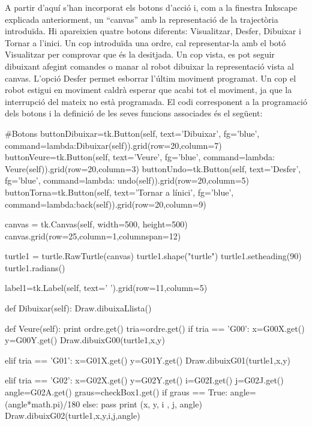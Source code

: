 A partir d’aquí s’han incorporat els botons d’acció i, com a la finestra Inkscape explicada anteriorment, un “canvas” amb la representació de la trajectòria introduïda. Hi apareixien quatre botons diferents: Visualitzar, Desfer, Dibuixar i Tornar a l’inici. Un cop introduïda una ordre, cal representar-la amb el botó Visualitzar per comprovar que és la desitjada. Un cop vista, es pot seguir dibuixant afegint comandes o manar al robot dibuixar la representació vista al canvas. L’opció Desfer permet esborrar l’últim moviment programat. Un cop el robot estigui en moviment caldrà esperar que acabi tot el moviment, ja que la interrupció del mateix no està programada. El codi corresponent a la programació dels botons i la definició de les seves funcions associades és el següent:

\begin{python}
			#Botons
			buttonDibuixar=tk.Button(self, text='Dibuixar', fg='blue', command=lambda:Dibuixar(self)).grid(row=20,column=7)
			buttonVeure=tk.Button(self, text='Veure', fg='blue', command=lambda: Veure(self)).grid(row=20,column=3)
			buttonUndo=tk.Button(self, text='Desfer', fg='blue', command=lambda: undo(self)).grid(row=20,column=5)
			buttonTorna=tk.Button(self, text='Tornar a l\'inici', fg='blue', command=lambda:back(self)).grid(row=20,column=9)
			
			canvas = tk.Canvas(self, width=500, height=500)
			canvas.grid(row=25,column=1,columnspan=12)
			
			turtle1 = turtle.RawTurtle(canvas)
			turtle1.shape("turtle")
			turtle1.setheading(90)
			turtle1.radians()
			
			label1=tk.Label(self, text='          ').grid(row=11,column=5)
			
			
			
			
			def Dibuixar(self):
				Draw.dibuixaLlista()
			
			
			def Veure(self):
				print ordre.get()
				tria=ordre.get()
				if tria == 'G00':
					x=G00X.get()
					y=G00Y.get()
					Draw.dibuixG00(turtle1,x,y)
			
				elif tria == 'G01':
				x=G01X.get()
				y=G01Y.get()
				Draw.dibuixG01(turtle1,x,y)
				
				elif tria == 'G02':
					x=G02X.get()
					y=G02Y.get()
					i=G02I.get()
					j=G02J.get()
					angle=G02A.get()
					graus=checkBox1.get()
					if graus == True:
						angle= (angle*math.pi)/180
					else:
						pass
					print (x, y, i , j, angle)
					Draw.dibuixG02(turtle1,x,y,i,j,angle)
				

\end{python}
